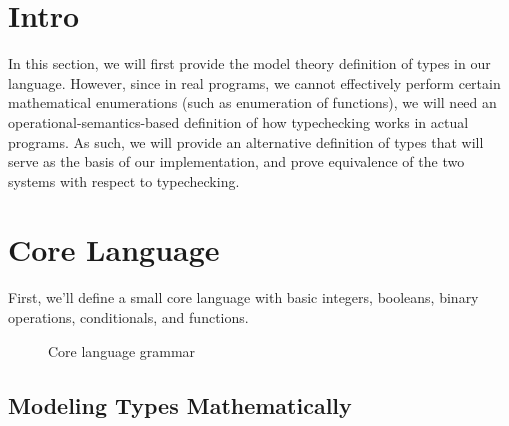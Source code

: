 \section{Intro}

In this section, we will first provide the model theory definition of types in 
our language. However, since in real programs, we cannot effectively perform 
certain mathematical enumerations (such as enumeration of functions), we will 
need an operational-semantics-based definition of how typechecking works in actual 
programs. As such, we will provide an alternative definition of types that will 
serve as the basis of our implementation, and prove equivalence of the two systems 
with respect to typechecking.

\section{Core Language}

First, we'll define a small core language with basic integers, booleans, binary 
operations, conditionals, and functions.

\begin{figure}[hbt!]%
  \begin{grammar}
            \grule[types]{\syntype}{
              \tint
              \gor \tbool
              \gor \tfun
          }
        \end{grammar}
    \caption{Core language grammar}
    \label{fig_Grammar}
\end{figure}

\subsection{Modeling Types Mathematically}

